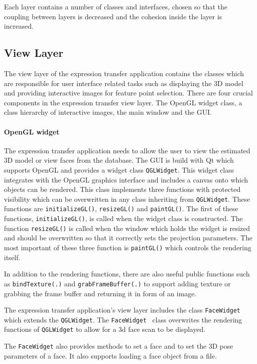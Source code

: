 \documentclass[11pt,a4paper]{report}
\begin{document}
Each layer contains a number of classes and interfaces, chosen so that the coupling
between layers is decreased and the cohesion inside the layer is increased. 

\subsection{View Layer}
The view layer of the expression transfer application contains the classes which
are responsible for user interface related tasks such as displaying the 3D model
and providing interactive images for feature point selection. There are four
crucial components in the expression transfer view layer. The
OpenGL widget class, a class hierarchy of interactive images, the main
window and the GUI.

\paragraph{OpenGL widget}
The expression transfer application needs to allow the user to view the
estimated 3D model or view faces from the database. The GUI is build with Qt
which supports OpenGL and provides a widget class \texttt{QGLWidget}. This
widget class integrates with the OpenGL graphics interface and includes a canvas
onto which objects can be rendered. This class implements three functions with
protected visibility which
can be overwritten in any class inheriting from \texttt{QGLWidget}. These
functions are \texttt{initializeGL()}, \texttt{resizeGL()} and
\texttt{paintGL()}. The first of these functions, \texttt{initializeGL()}, is
called when the widget class is constructed. The function \texttt{resizeGL()} is
called when the window which holds the widget is resized and should be
overwritten so that it correctly sets the projection parameters. The most important of
these three function is \texttt{paintGL()} which controls the rendering itself.

In addition to the rendering functions, there are also useful public functions
such as \texttt{bindTexture(.)} and \texttt{grabFrameBuffer(.)} to support
adding texture or grabbing the frame buffer and returning it in form of an
image.

The expression transfer application's view layer includes the class
\texttt{FaceWidget} which extends the \texttt{QGLWidget}. The \texttt{FaceWidget
} class overwrites the rendering functions of \texttt{QGLWidget} to allow for a
3d face scan to be displayed.

The \texttt{FaceWidget} also provides methods to set a face and to set the 3D
pose parameters of a face. It also supports loading a face object from a file.
\end{document}
